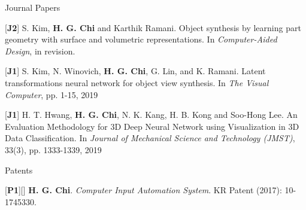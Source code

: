 \begin{cventries}
\cvpub
{Journal Papers} %
{ %
\begin{cvitems}
\item {[\textbf{J2}] S. Kim, \textbf{H. G. Chi} and Karthik Ramani. Object synthesis by learning part geometry with surface and volumetric representations. In \textit{Computer-Aided Design}, in revision.}
\item {[\textbf{J1}] S. Kim, N. Winovich, \textbf{H. G. Chi}, G. Lin, and K. Ramani. Latent transformations neural network for object view synthesis. In \textit{The Visual Computer}, pp. 1-15, 2019}
\item {[\textbf{J1}] H. T. Hwang, \textbf{H. G. Chi}, N. K. Kang, H. B. Kong and Soo-Hong Lee. An Evaluation Methodology for 3D Deep Neural Network using Visualization in 3D Data Classification. In \textit{Journal of Mechanical Science and Technology (JMST)}, 33(3), pp. 1333-1339, 2019}
\end{cvitems}
}


\cvpub
{Patents}{
\begin{cvitems}
\item {[\textbf{P1}][\href{https://docs.google.com/viewer?url=https://github.com/stnoah1/CV/raw/master/documents/patent.pdf}{}] \textbf{H. G. Chi}.  \textit{Computer Input Automation System}. KR Patent (2017): 10-1745330.}
\end{cvitems}
}



\end{cventries}
